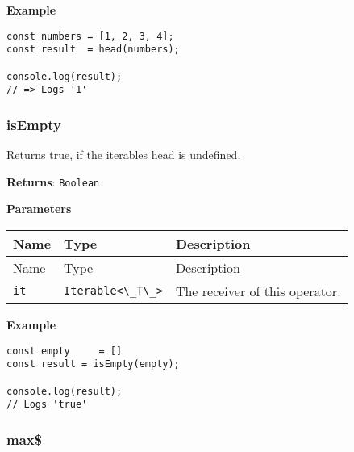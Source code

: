 \textbf{Example}

\begin{lstlisting}[label=52bff184-a4bc-4651-9a65-eace96baeaa5]
const numbers = [1, 2, 3, 4];
const result  = head(numbers);
                              
console.log(result);
// => Logs '1'
\end{lstlisting}

\hypertarget{4f9c8f02-8045-4c55-980b-19761e4a0c5c}{%
\subsubsection{isEmpty}\label{4f9c8f02-8045-4c55-980b-19761e4a0c5c}}

Returns true, if the iterables head is undefined.

\textbf{Returns}: \passthrough{\lstinline!Boolean!}

\textbf{Parameters}

\begin{longtable}[]{
  >{\raggedright\arraybackslash}p{}
  >{\raggedright\arraybackslash}p{}
  >{\raggedright\arraybackslash}p{}@{}}

\toprule\noalign{}
Name & Type & Description \\
\midrule\noalign{}
\endfirsthead
\toprule\noalign{}
Name & Type & Description \\
\midrule\noalign{}
\endhead
\bottomrule\noalign{}
\endlastfoot
\passthrough{\lstinline!it!} & \passthrough{\lstinline!Iterable<\_T\_>!}
& The receiver of this operator. \\
\end{longtable}

\textbf{Example}

\begin{lstlisting}[label=636c2abf-60c6-4c38-a240-b51fa06f74b1]
const empty     = []
const result = isEmpty(empty);
                              
console.log(result);
// Logs 'true'
\end{lstlisting}

\hypertarget{f5d04902-359f-4b27-b811-851551c0d1fe}{%
\subsubsection{max\$}\label{f5d04902-359f-4b27-b811-851551c0d1fe}}

